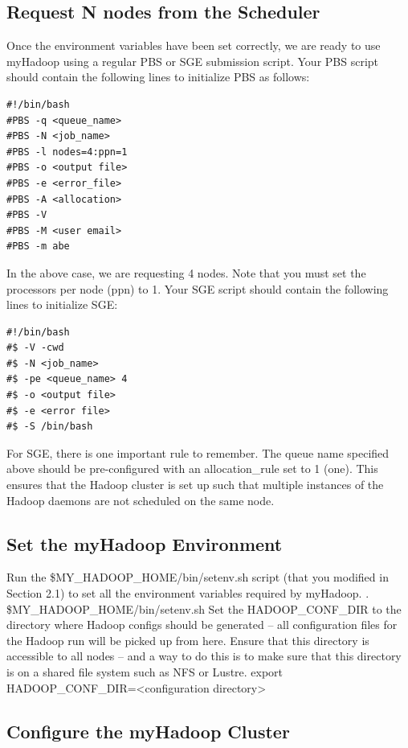\documentclass{article}
\begin{document}
\subsection{Request N nodes from the Scheduler}

Once the environment variables have been set correctly, we are ready to use myHadoop
using a regular PBS or SGE submission script. Your PBS script should contain the
following lines to initialize PBS as follows:

\begin{verbatim}
#!/bin/bash
#PBS -q <queue_name>
#PBS -N <job_name>
#PBS -l nodes=4:ppn=1
#PBS -o <output file>
#PBS -e <error_file>
#PBS -A <allocation>
#PBS -V
#PBS -M <user email>
#PBS -m abe
\end{verbatim}

In the above case, we are requesting 4 nodes. Note that you must set the processors per
node (ppn) to 1.
Your SGE script should contain the following lines to initialize SGE:

\begin{verbatim}
#!/bin/bash
#$ -V -cwd
#$ -N <job_name>
#$ -pe <queue_name> 4
#$ -o <output file>
#$ -e <error file>
#$ -S /bin/bash
\end{verbatim}

For SGE, there is one important rule to remember. The queue name specified above
should be pre-configured with an allocation\_rule set to 1 (one). This ensures that the
Hadoop cluster is set up such that multiple instances of the Hadoop daemons are not
scheduled on the same node.

\subsection{Set the myHadoop Environment}

Run the \$MY\_HADOOP\_HOME/bin/setenv.sh script (that you modified in Section 2.1)
to set all the environment variables required by myHadoop.
. \$MY\_HADOOP\_HOME/bin/setenv.sh
Set the HADOOP\_CONF\_DIR to the directory where Hadoop configs should be
generated – all configuration files for the Hadoop run will be picked up from here. Ensure
that this directory is accessible to all nodes – and a way to do this is to make sure that this
directory is on a shared file system such as NFS or Lustre.
export HADOOP\_CONF\_DIR=<configuration directory>

\subsection{Configure the myHadoop Cluster}
\end{document}
